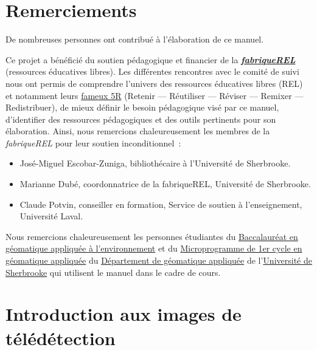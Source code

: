 \documentclass[
  french,
  11pt,
  letterpaper,
  open=any,
  twoside=false,
  french]{scrbook}
\begin{document}
\section*{Remerciements}\label{sect005}


De nombreuses personnes ont contribué à l'élaboration de ce manuel.

Ce projet a bénéficié du soutien pédagogique et financier de la
\href{https://fabriquerel.org/}{\textbf{\emph{fabriqueREL}}} (ressources
éducatives libres). Les différentes rencontres avec le comité de suivi
nous ont permis de comprendre l'univers des ressources éducatives libres
(REL) et notamment leurs \href{https://fabriquerel.org/rel/}{fameux 5R}
(Retenir --- Réutiliser --- Réviser --- Remixer --- Redistribuer), de
mieux définir le besoin pédagogique visé par ce manuel, d'identifier des
ressources pédagogiques et des outils pertinents pour son élaboration.
Ainsi, nous remercions chaleureusement les membres de la
\emph{fabriqueREL} pour leur soutien inconditionnel~:

\begin{itemize}
\item
  José-Miguel Escobar-Zuniga, bibliothécaire à l'Université de
  Sherbrooke.
\item
  Marianne Dubé, coordonnatrice de la fabriqueREL, Université de
  Sherbrooke.
\item
  Claude Potvin, conseiller en formation, Service de soutien à
  l'enseignement, Université Laval.
\end{itemize}

Nous remercions chaleureusement les personnes étudiantes du
\href{https://www.usherbrooke.ca/admission/programme/271/baccalaureat-en-geomatiqueappliquee-a-lenvironnement/}{Baccalauréat
en géomatique appliquée à l'environnement} et du
\href{https://www.usherbrooke.ca/admission/programme/429/microprogramme-de-1er-cycleen-geomatique-appliquee/}{Microprogramme
de 1er cycle en géomatique appliquée} du
\href{https://www.usherbrooke.ca/geomatique/}{Département de géomatique
appliquée} de l'\href{https://www.usherbrooke.ca/}{Université de
Sherbrooke} qui utilisent le manuel dans le cadre de cours.

\section*{Introduction aux images de télédétection}\label{sect006}
\end{document}
